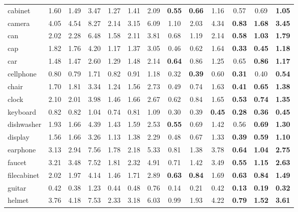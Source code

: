 \begin{table*}[t]
\begin{tabular}{l|ccc|ccc|ccc|ccc}
		cabinet 	   & 1.60 & 1.49 & 3.47 & 1.27 & 1.41 & 2.09 & \textbf{0.55} & \textbf{0.66} & 1.16 & 0.57 & 0.69 & \textbf{1.05} \\
		camera 		   & 4.05 & 4.54 & 8.27 & 2.14 & 3.15 & 6.09 & 1.10 & 2.03 & 4.34 & \textbf{0.83} & \textbf{1.68} & \textbf{3.45} \\
		can 		   & 2.02 & 2.28 & 6.48 & 1.58 & 2.11 & 3.81 & 0.68 & 1.19 & 2.14 & \textbf{0.58} & \textbf{1.03} & \textbf{1.79} \\
		cap 		   & 1.82 & 1.76 & 4.20 & 1.17 & 1.37 & 3.05 & 0.46 & 0.62 & 1.64 & \textbf{0.33} & \textbf{0.45} & \textbf{1.18} \\
		car 		   & 1.48 & 1.47 & 2.60 & 1.29 & 1.48 & 2.14 & \textbf{0.64} & 0.86 & 1.25 & 0.65 & \textbf{0.86} & \textbf{1.17} \\
		cellphone 	   & 0.80 & 0.79 & 1.71 & 0.82 & 0.91 & 1.18 & 0.32 & \textbf{0.39} & 0.60 & \textbf{0.31} & 0.40 & \textbf{0.54} \\
		chair 		   & 1.70 & 1.81 & 3.34 & 1.24 & 1.56 & 2.73 & 0.49 & 0.74 & 1.63 & \textbf{0.41} & \textbf{0.65} & \textbf{1.38} \\
		clock 		   & 2.10 & 2.01 & 3.98 & 1.46 & 1.66 & 2.67 & 0.62 & 0.84 & 1.65 & \textbf{0.53} & \textbf{0.74} & \textbf{1.35} \\
		keyboard 	   & 0.82 & 0.82 & 1.04 & 0.74 & 0.81 & 1.09 & 0.30 & 0.39 & \textbf{0.45} & \textbf{0.28} & \textbf{0.36} & \textbf{0.45} \\
		dishwasher 	   & 1.93 & 1.66 & 4.39 & 1.43 & 1.59 & 2.53 & \textbf{0.55} & 0.69 & 1.42 & 0.56 & \textbf{0.69} & \textbf{1.30} \\
		display 	   & 1.56 & 1.66 & 3.26 & 1.13 & 1.38 & 2.29 & 0.48 & 0.67 & 1.33 & \textbf{0.39} & \textbf{0.59} & \textbf{1.10} \\
		earphone 	   & 3.13 & 2.94 & 7.56 & 1.78 & 2.18 & 5.33 & 0.81 & 1.38 & 3.78 & \textbf{0.64} & \textbf{1.04} & \textbf{2.75} \\
		faucet 		   & 3.21 & 3.48 & 7.52 & 1.81 & 2.32 & 4.91 & 0.71 & 1.42 & 3.49 & \textbf{0.55} & \textbf{1.15} & \textbf{2.63} \\
		filecabinet    & 2.02 & 1.97 & 4.14 & 1.46 & 1.71 & 2.89 & \textbf{0.63} & \textbf{0.84} & 1.69 & \textbf{0.63} & \textbf{0.84} & \textbf{1.49} \\
		guitar 		   & 0.42 & 0.38 & 1.23 & 0.44 & 0.48 & 0.76 & 0.14 & 0.21 & 0.42 & \textbf{0.13} & \textbf{0.19} & \textbf{0.32} \\
		helmet 		   & 3.76 & 4.18 & 7.53 & 2.33 & 3.18 & 6.03 & 0.99 & 1.93 & 4.22 & \textbf{0.79} & \textbf{1.52} & \textbf{3.61} \\

\end{tabular}
\end{table*}
